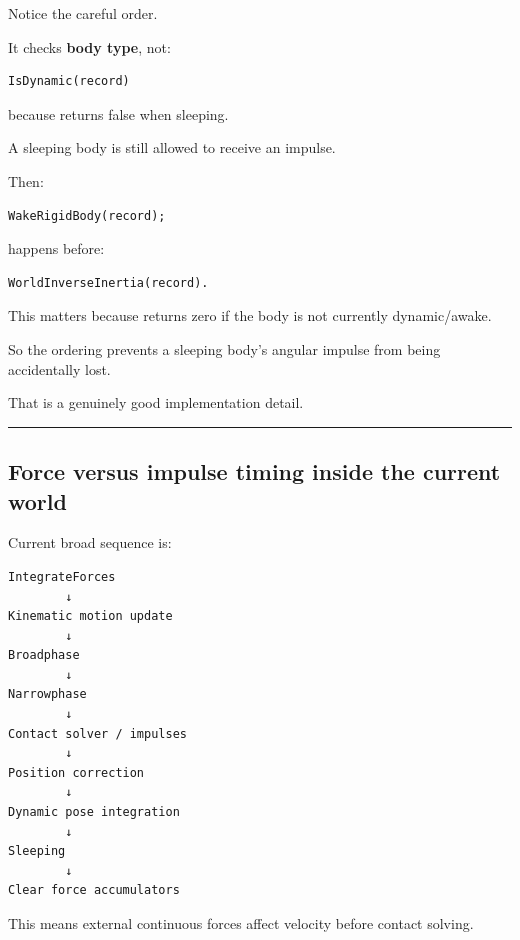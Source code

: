 Notice the careful order.

It checks \textbf{body type}, not:

\begin{verbatim}
IsDynamic(record)
\end{verbatim}

because  returns false when sleeping.

A sleeping body is still allowed to receive an impulse.

Then:

\begin{verbatim}
WakeRigidBody(record);
\end{verbatim}

happens before:

\begin{verbatim}
WorldInverseInertia(record).
\end{verbatim}

This matters because  returns zero if the body is not currently dynamic/awake.

So the ordering prevents a sleeping body's angular impulse from being accidentally lost.

That is a genuinely good implementation detail.

\begin{center}\rule{0.5\linewidth}{0.5pt}\end{center}

\subsection{Force versus impulse timing inside the current world}\label{06-engine-ii-ch037-force-versus-impulse-timing-inside-the-current-world}

\hypertarget{06-engine-ii-ch037-force-versus-impulse-timing-inside-the-current-world}{}

Current broad sequence is:

\begin{verbatim}
IntegrateForces
        ↓
Kinematic motion update
        ↓
Broadphase
        ↓
Narrowphase
        ↓
Contact solver / impulses
        ↓
Position correction
        ↓
Dynamic pose integration
        ↓
Sleeping
        ↓
Clear force accumulators
\end{verbatim}

This means external continuous forces affect velocity before contact solving.

